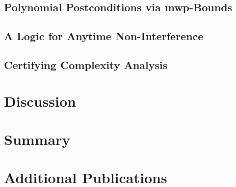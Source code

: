     \section{Polynomial Postconditions via mwp-Bounds}\label{sec:postcond}
    
    \clearpage

    \section{A Logic for Anytime Non-Interference}\label{sec:anytime}
    
    \clearpage

    \section{Certifying Complexity Analysis}\label{coqpl}
    
    \clearpage

\chapter{Discussion}\label{ch:discussion}


\chapter{Summary}\label{ch:summary}


\backmatter
\printbibliography[label=chap:references, title=References]
\let\printbibliography\relax

\appendix

\chapter{Additional Publications}\label{additional-manuscripts}
\clearpage

